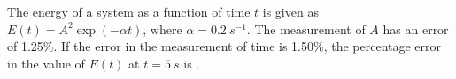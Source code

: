 
    \item The energy of a system as a function of time $t$ is given as $E(t) = A^2 \exp(-\alpha t)$, where $\alpha = 0.2\ s^{-1}$. The measurement of $A$ has an error of 1.25\%. If the error in the measurement of time is 1.50\%, the percentage error in the value of $E(t)$ at $t = 5\ s$ is \underline{\hspace{2.5 cm}}.
